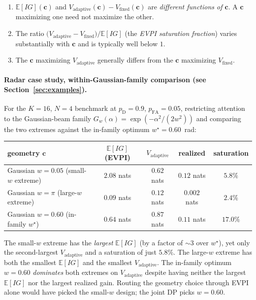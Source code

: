\documentclass[11pt,a4paper]{article}
\newcommand{\E}{\mathbb{E}}
\begin{document}
\begin{enumerate}[nosep, leftmargin=2em]
\item $\E[IG](\bm{c})$ and $V_{\mathrm{adaptive}}(\bm{c}) - V_{\mathrm{fixed}}(\bm{c})$ are \emph{different functions of $\bm{c}$}.  A $\bm{c}$ maximizing one need not maximize the other.
\item The ratio $\bigl(V_{\mathrm{adaptive}} - V_{\mathrm{fixed}}\bigr) / \E[IG]$ (the \emph{EVPI saturation fraction}) varies substantially with $\bm{c}$ and is typically well below $1$.
\item The $\bm{c}$ maximizing $V_{\mathrm{adaptive}}$ generally differs from the $\bm{c}$ maximizing $V_{\mathrm{fixed}}$.
\end{enumerate}

\paragraph{Radar case study, within-Gaussian-family comparison (see Section~\ref{sec:examples}).}
For the $K = 16$, $N = 4$ benchmark at $p_{\mathrm{D}} = 0.9$, $p_{\mathrm{FA}} = 0.05$, restricting attention to the Gaussian-beam family $G_w(\alpha) = \exp(-\alpha^2/(2w^2))$ and comparing the two extremes against the in-family optimum $w^\star = 0.60$~rad:
\begin{center}
\begin{tabular}{@{}lcccc@{}}
\toprule
geometry $\bm{c}$ & $\E[IG]$ (EVPI) & $V_{\mathrm{adaptive}}$ & realized & saturation \\
\midrule
Gaussian $w = 0.05$ (small-$w$ extreme)   & $2.08$ nats & $0.62$ nats           & $0.12$ nats          & $5.8\%$           \\
Gaussian $w = \pi$\phantom{.05} (large-$w$ extreme) & $0.09$ nats & $0.12$ nats           & $0.002$ nats         & $2.4\%$           \\
Gaussian $w = 0.60$ (in-family $w^\star$) & $0.64$ nats & $\mathbf{0.87}$ nats  & $0.11$ nats          & $\mathbf{17.0\%}$ \\
\bottomrule
\end{tabular}
\end{center}
The small-$w$ extreme has the \emph{largest} $\E[IG]$ (by a factor of $\sim\!3$ over $w^\star$), yet only the second-largest $V_{\mathrm{adaptive}}$ and a saturation of just $5.8\%$.  The large-$w$ extreme has both the smallest $\E[IG]$ and the smallest $V_{\mathrm{adaptive}}$.  The in-family optimum $w = 0.60$ \emph{dominates} both extremes on $V_{\mathrm{adaptive}}$ despite having neither the largest $\E[IG]$ nor the largest realized gain.  Routing the geometry choice through EVPI alone would have picked the small-$w$ design; the joint DP picks $w = 0.60$.
\end{document}
